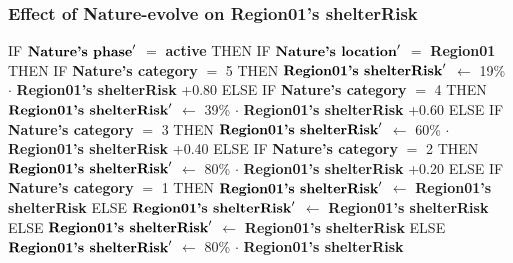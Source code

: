 \documentclass{article}%
\begin{document}
%
\subsubsection{Effect of Nature{-}evolve on Region01's shelterRisk}%
\label{ssubsec:Effect of Nature{-}evolve on Region01's shelterRisk}%
\begin{flushleft}%
IF %
$\mbox{\textbf{Nature's phase}} '$%
$=$%
\textbf{active}%
\linebreak%
\hspace*{2em}%
THEN %
IF %
$\mbox{\textbf{Nature's location}} '$%
$=$%
\textbf{Region01}%
\linebreak%
\hspace*{4em}%
THEN %
IF %
\textbf{Nature's category}%
$=$%
5%
\linebreak%
\hspace*{6em}%
THEN %
$\mbox{\textbf{Region01's shelterRisk}} '$%
$\leftarrow$%
19\%%
$\cdot$%
\textbf{Region01's shelterRisk}%
+0.80%
\linebreak%
\hspace*{6em}%
ELSE %
IF %
\textbf{Nature's category}%
$=$%
4%
\linebreak%
\hspace*{8em}%
THEN %
$\mbox{\textbf{Region01's shelterRisk}} '$%
$\leftarrow$%
39\%%
$\cdot$%
\textbf{Region01's shelterRisk}%
+0.60%
\linebreak%
\hspace*{8em}%
ELSE %
IF %
\textbf{Nature's category}%
$=$%
3%
\linebreak%
\hspace*{10em}%
THEN %
$\mbox{\textbf{Region01's shelterRisk}} '$%
$\leftarrow$%
60\%%
$\cdot$%
\textbf{Region01's shelterRisk}%
+0.40%
\linebreak%
\hspace*{10em}%
ELSE %
IF %
\textbf{Nature's category}%
$=$%
2%
\linebreak%
\hspace*{12em}%
THEN %
$\mbox{\textbf{Region01's shelterRisk}} '$%
$\leftarrow$%
80\%%
$\cdot$%
\textbf{Region01's shelterRisk}%
+0.20%
\linebreak%
\hspace*{12em}%
ELSE %
IF %
\textbf{Nature's category}%
$=$%
1%
\linebreak%
\hspace*{14em}%
THEN %
$\mbox{\textbf{Region01's shelterRisk}} '$%
$\leftarrow$%
\textbf{Region01's shelterRisk}%
\linebreak%
\hspace*{14em}%
ELSE %
$\mbox{\textbf{Region01's shelterRisk}} '$%
$\leftarrow$%
\textbf{Region01's shelterRisk}%
\linebreak%
\hspace*{4em}%
ELSE %
$\mbox{\textbf{Region01's shelterRisk}} '$%
$\leftarrow$%
\textbf{Region01's shelterRisk}%
\linebreak%
\hspace*{2em}%
ELSE %
$\mbox{\textbf{Region01's shelterRisk}} '$%
$\leftarrow$%
80\%%
$\cdot$%
\textbf{Region01's shelterRisk}%
\end{flushleft}
\end{document}
